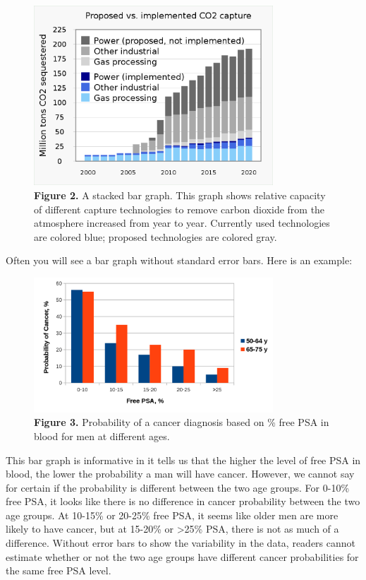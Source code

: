 \documentclass[
]{book}
\begin{document}
\begin{figure}
\centering
\includegraphics[width=0.8\textwidth,height=\textheight]{images/20210413_Carbon_capture_and_storage_-_CCS_-_proposed_vs_implemented.svg.png}
\caption{\textbf{Figure 2.} A stacked bar graph. This graph shows relative capacity of different capture technologies to remove carbon dioxide from the atmosphere increased from year to year. Currently used technologies are colored blue; proposed technologies are colored gray.}
\end{figure}

Often you will see a bar graph without standard error bars. Here is an example:

\begin{figure}
\centering
\includegraphics[width=0.8\textwidth,height=\textheight]{images/1280px-Free_PSA_bar_graph.svg.png}
\caption{\textbf{Figure 3.} Probability of a cancer diagnosis based on \% free PSA in blood for men at different ages.}
\end{figure}

This bar graph is informative in it tells us that the higher the level of free PSA in blood, the lower the probability a man will have cancer. However, we cannot say for certain if the probability is different between the two age groups. For 0-10\% free PSA, it looks like there is no difference in cancer probability between the two age groups. At 10-15\% or 20-25\% free PSA, it seems like older men are more likely to have cancer, but at 15-20\% or \textgreater25\% PSA, there is not as much of a difference. Without error bars to show the variability in the data, readers cannot estimate whether or not the two age groups have different cancer probabilities for the same free PSA level.
\end{document}
